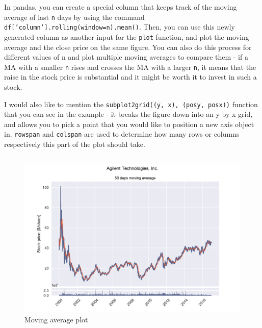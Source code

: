 \documentclass[12pt, a4paper]{article}
\begin{document}
In pandas, you can create a special column that keeps track of the moving average of last \texttt{n} days by using the command \texttt{df['column'].rolling(window=n).mean()}. Then, you can use this newly generated column as another input for the \texttt{plot} function, and plot the moving average and the close price on the same figure. You can also do this process for different values of n and plot multiple moving averages to compare them - if a MA with a smaller \texttt{n} rises and crosses the MA with a larger \texttt{n}, it means that the raise in the stock price is substantial and it might be worth it to invest in such a stock.

I would also like to mention the \texttt{subplot2grid((y, x), (posy, posx))} function that you can see in the example - it breaks the figure down into an y by x grid, and allows you to pick a point that you would like to position a new axis object in. \texttt{rowspan} and \texttt{colspan} are used to determine how many rows or columns respectively this part of the plot should take.

\bgroup
  \inputminted[linenos, breaklines=true, fontsize=\scriptsize, firstnumber=last]{python}{src/stocks/simple/3_moving_avg.py}
  \label{listing:ssimp_3}
\egroup

\begin{figure}[H]
    \centering
    \includegraphics[width=\textwidth]{src/stocks/simple/movingavg}
    \caption{Moving average plot}
    \label{fig:stock_movingavg}
\end{figure}
\end{document}
